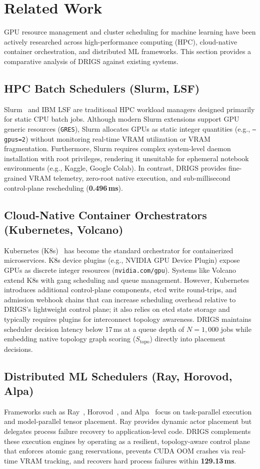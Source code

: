 \section{Related Work}
\label{sec:related_work}

GPU resource management and cluster scheduling for machine learning have been actively researched across high-performance computing (HPC), cloud-native container orchestration, and distributed ML frameworks. This section provides a comparative analysis of DRIGS against existing systems.

\subsection{HPC Batch Schedulers (Slurm, LSF)}
Slurm~\cite{slurm} and IBM LSF are traditional HPC workload managers designed primarily for static CPU batch jobs. Although modern Slurm extensions support GPU generic resources (\texttt{GRES}), Slurm allocates GPUs as static integer quantities (e.g., \texttt{--gpus=2}) without monitoring real-time VRAM utilization or VRAM fragmentation. Furthermore, Slurm requires complex system-level daemon installation with root privileges, rendering it unsuitable for ephemeral notebook environments (e.g., Kaggle, Google Colab). In contrast, DRIGS provides fine-grained VRAM telemetry, zero-root native execution, and sub-millisecond control-plane rescheduling (\textbf{0.496\,ms}).

\subsection{Cloud-Native Container Orchestrators (Kubernetes, Volcano)}
Kubernetes (K8s)~\cite{kubernetes} has become the standard orchestrator for containerized microservices. K8s device plugins (e.g., NVIDIA GPU Device Plugin) expose GPUs as discrete integer resources (\texttt{nvidia.com/gpu}). Systems like Volcano~\cite{volcano} extend K8s with gang scheduling and queue management. However, Kubernetes introduces additional control-plane components, etcd write round-trips, and admission webhook chains that can increase scheduling overhead relative to DRIGS's lightweight control plane; it also relies on etcd state storage and typically requires plugins for interconnect topology awareness. DRIGS maintains scheduler decision latency below 17\,ms at a queue depth of $N=1,000$ jobs while embedding native topology graph scoring ($S_{\text{topo}}$) directly into placement decisions.


\subsection{Distributed ML Schedulers (Ray, Horovod, Alpa)}
Frameworks such as Ray~\cite{ray}, Horovod~\cite{horovod}, and Alpa~\cite{alpa} focus on task-parallel execution and model-parallel tensor placement. Ray provides dynamic actor placement but delegates process failure recovery to application-level code. DRIGS complements these execution engines by operating as a resilient, topology-aware control plane that enforces atomic gang reservations, prevents CUDA OOM crashes via real-time VRAM tracking, and recovers hard process failures within \textbf{129.13\,ms}.

